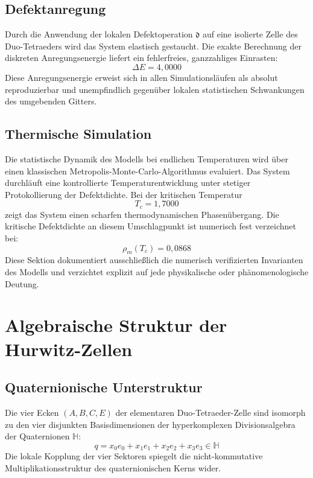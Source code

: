 \documentclass[11pt,a4paper]{article}
\newcommand{\Halg}{\mathbb{H}}
\begin{document}
\subsection{Defektanregung}
Durch die Anwendung der lokalen Defektoperation $\mathfrak{d}$ auf eine isolierte Zelle des Duo-Tetraeders wird das System elastisch gestaucht. Die exakte Berechnung der diskreten Anregungsenergie liefert ein fehlerfreies, ganzzahliges Einrasten:
\begin{equation}
	\Delta E = 4{,}0000
\end{equation}
Diese Anregungsenergie erweist sich in allen Simulationsläufen als absolut reproduzierbar und unempfindlich gegenüber lokalen statistischen Schwankungen des umgebenden Gitters.

\subsection{Thermische Simulation}
Die statistische Dynamik des Modells bei endlichen Temperaturen wird über einen klassischen Metropolis-Monte-Carlo-Algorithmus evaluiert. Das System durchläuft eine kontrollierte Temperaturentwicklung unter stetiger Protokollierung der Defektdichte. Bei der kritischen Temperatur
\begin{equation}
	T_c = 1{,}7000
\end{equation}
zeigt das System einen scharfen thermodynamischen Phasenübergang. Die kritische Defektdichte an diesem Umschlagpunkt ist numerisch fest verzeichnet bei:
\begin{equation}
	\rho_m(T_c) = 0{,}0868
\end{equation}
Diese Sektion dokumentiert ausschließlich die numerisch verifizierten Invarianten des Modells und verzichtet explizit auf jede physikalische oder phänomenologische Deutung.

\section{Algebraische Struktur der Hurwitz-Zellen}

\subsection{Quaternionische Unterstruktur}
Die vier Ecken $(A, B, C, E)$ der elementaren Duo-Tetraeder-Zelle sind isomorph zu den vier disjunkten Basisdimensionen der hyperkomplexen Divisionsalgebra der Quaternionen $\Halg$:
\begin{equation}
	q = x_0 e_0 + x_1 e_1 + x_2 e_2 + x_3 e_3 \in \Halg
\end{equation}
Die lokale Kopplung der vier Sektoren spiegelt die nicht-kommutative Multiplikationsstruktur des quaternionischen Kerns wider.
\end{document}
